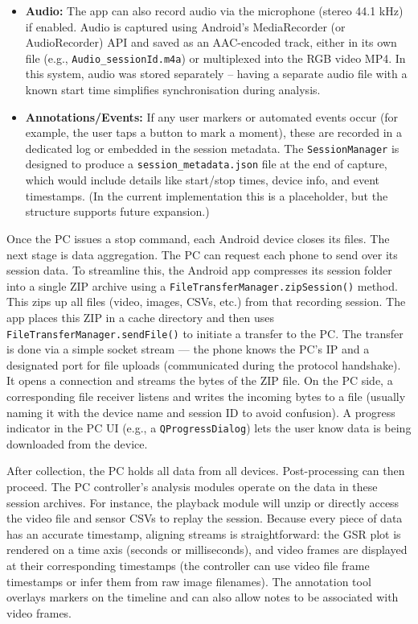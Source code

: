 \begin{itemize}
  \item \textbf{Audio:} The app can also record audio via the microphone (stereo 44.1 kHz) if enabled. Audio is captured using Android's MediaRecorder (or AudioRecorder) API and saved as an AAC-encoded track, either in its own file (e.g., \texttt{Audio\_\<sessionId\>.m4a}) or multiplexed into the RGB video MP4. In this system, audio was stored separately -- having a separate audio file with a known start time simplifies synchronisation during analysis.
  \item \textbf{Annotations/Events:} If any user markers or automated events occur (for example, the user taps a button to mark a moment), these are recorded in a dedicated log or embedded in the session metadata. The \texttt{SessionManager} is designed to produce a \texttt{session\_metadata.json} file at the end of capture, which would include details like start/stop times, device info, and event timestamps. (In the current implementation this is a placeholder, but the structure supports future expansion.)
\end{itemize}

Once the PC issues a stop command, each Android device closes its files. The next stage is data aggregation. The PC can request each phone to send over its session data. To streamline this, the Android app compresses its session folder into a single ZIP archive using a \texttt{FileTransferManager.zipSession()} method. This zips up all files (video, images, CSVs, etc.) from that recording session. The app places this ZIP in a cache directory and then uses \texttt{FileTransferManager.sendFile()} to initiate a transfer to the PC. The transfer is done via a simple socket stream --- the phone knows the PC's IP and a designated port for file uploads (communicated during the protocol handshake). It opens a connection and streams the bytes of the ZIP file. On the PC side, a corresponding file receiver listens and writes the incoming bytes to a file (usually naming it with the device name and session ID to avoid confusion). A progress indicator in the PC UI (e.g., a \texttt{QProgressDialog}) lets the user know data is being downloaded from the device.

After collection, the PC holds all data from all devices. Post-processing can then proceed. The PC controller's analysis modules operate on the data in these session archives. For instance, the playback module will unzip or directly access the video file and sensor CSVs to replay the session. Because every piece of data has an accurate timestamp, aligning streams is straightforward: the GSR plot is rendered on a time axis (seconds or milliseconds), and video frames are displayed at their corresponding timestamps (the controller can use video file frame timestamps or infer them from raw image filenames). The annotation tool overlays markers on the timeline and can also allow notes to be associated with video frames.

